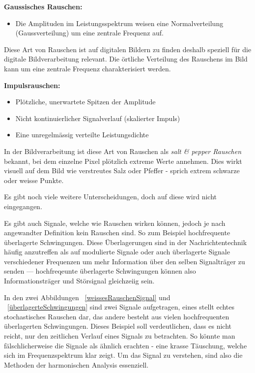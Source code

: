 \begin{definition}{\bf Gaussisches Rauschen:}
	\begin{itemize}
		\item Die Amplituden im Leistungsspektrum weisen eine Normalverteilung (Gaussverteilung) um eine zentrale Frequenz auf.
	\end{itemize}
\end{definition}
Diese Art von Rauschen ist auf digitalen Bildern zu finden deshalb speziell für die digitale Bildverarbeitung relevant. Die örtliche Verteilung des Rauschens im Bild kann um eine zentrale Frequenz charakterisiert werden.

\begin{definition}{\bf Impulsrauschen:}
	\begin{itemize}
		\item Plötzliche, unerwartete Spitzen der Amplitude 
		\item Nicht kontinuierlicher Signalverlauf (skalierter Impuls)
		\item Eine unregelmässig verteilte Leistungsdichte
	\end{itemize}
\end{definition}
In der Bildverarbeitung ist diese Art von Rauschen als \textit{salt \& pepper Rauschen} bekannt, bei dem einzelne Pixel plötzlich extreme Werte annehmen. Dies wirkt visuell auf dem Bild wie verstreutes Salz oder Pfeffer - sprich extrem schwarze oder weisse Punkte.


Es gibt noch viele weitere Unterscheidungen, doch auf diese wird nicht eingegangen.


Es gibt auch Signale, welche wie Rauschen wirken können, jedoch je nach angewandter Definition kein Rauschen sind. So zum Beispiel hochfrequente überlagerte Schwingungen. Diese Überlagerungen sind in der Nachrichtentechnik häufig anzutreffen als auf modulierte Signale oder auch überlagerte Signale verschiedener Frequenzen um mehr Information über den selben Signalträger zu senden --- hochfreqeunte überlagerte Schwingungen können also Informationsträger und Störsignal gleichzeiig sein.


In den zwei Abbildungen ~\ref{weissesRauschenSignal} und ~\ref{überlagerteSchwingungen} sind zwei Signale aufgetragen, eines stellt echtes stochastisches Rauschen dar, das andere besteht aus vielen hochfrequenten überlagerten Schwingungen. Dieses Beispiel soll verdeutlichen, dass es nicht reicht, nur den zeitlichen Verlauf eines Signals zu betrachten. So könnte man fälschlicherweise die Signale als ähnlich erachten - eine krasse Täuschung, welche sich im Frequenzspektrum klar zeigt. Um das Signal zu verstehen, sind also die Methoden  der harmonischen Analysis essenziell. 

